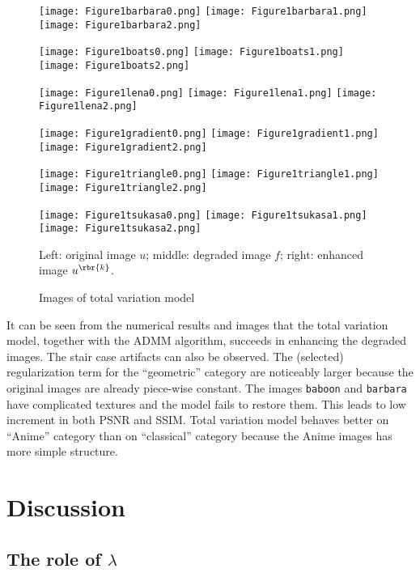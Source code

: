 \documentclass[english, nochinese]{pnote}
\begin{document}
\begin{figure}[htbp]
{
\centering

\texttt{[image: Figure1barbara0.png]}
\texttt{[image: Figure1barbara1.png]}
\texttt{[image: Figure1barbara2.png]}

\texttt{[image: Figure1boats0.png]}
\texttt{[image: Figure1boats1.png]}
\texttt{[image: Figure1boats2.png]}

\texttt{[image: Figure1lena0.png]}
\texttt{[image: Figure1lena1.png]}
\texttt{[image: Figure1lena2.png]}

\texttt{[image: Figure1gradient0.png]}
\texttt{[image: Figure1gradient1.png]}
\texttt{[image: Figure1gradient2.png]}

\texttt{[image: Figure1triangle0.png]}
\texttt{[image: Figure1triangle1.png]}
\texttt{[image: Figure1triangle2.png]}

\texttt{[image: Figure1tsukasa0.png]}
\texttt{[image: Figure1tsukasa1.png]}
\texttt{[image: Figure1tsukasa2.png]}

\caption{Images of total variation model}
\label{Fig:Num}
}
{
\footnotesize Left: original image $u$; middle: degraded image $f$; right: enhanced image $u^{\rbr{k}}$.
}
\end{figure}

It can be seen from the numerical results and images that the total variation model, together with the ADMM algorithm, succeeds in enhancing the degraded images. The stair case artifacts can also be observed. The (selected) regularization term for the ``geometric'' category are noticeably larger because the original images are already piece-wise constant. The images \verb"baboon" and \verb"barbara" have complicated textures and the model fails to restore them. This leads to low increment in both PSNR and SSIM. Total variation model behaves better on ``Anime'' category than on ``classical'' category because the Anime images has more simple structure.

\section{Discussion}

\subsection{The role of $\lambda$}
\end{document}
